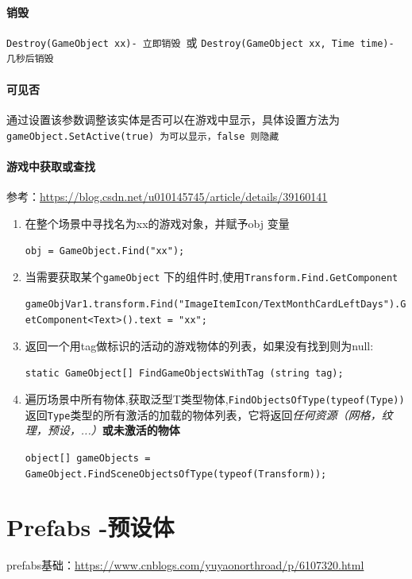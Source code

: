\documentclass[UTF8,a4paper,12pt]{ctexbook}
\begin{document}
		\paragraph{销毁}
			\verb|Destroy(GameObject xx)- 立即销毁 |或 \verb|Destroy(GameObject xx, Time time)- 几秒后销毁|
			
		\paragraph{可见否}
			通过设置该参数调整该实体是否可以在游戏中显示，具体设置方法为\verb|gameObject.SetActive(true) 为可以显示，false 则隐藏|
		
		\paragraph{游戏中获取或查找}
			参考：\url{https://blog.csdn.net/u010145745/article/details/39160141}
			
			\begin{enumerate}
				\item 在整个场景中寻找名为xx的游戏对象，并赋予obj 变量
					
					\verb|obj = GameObject.Find("xx");|
					
				\item 当需要获取某个\verb|gameObject| 下的组件时,使用\verb|Transform.Find.GetComponent|
					
					\verb|gameObjVar1.transform.Find("ImageItemIcon/TextMonthCardLeftDays").GetComponent<Text>().text = "xx";|
				
				\item 返回一个用tag做标识的活动的游戏物体的列表，如果没有找到则为null: 
				
					\verb|static GameObject[] FindGameObjectsWithTag (string tag);|
				
				\item 遍历场景中所有物体,获取泛型T类型物体,\verb|FindObjectsOfType(typeof(Type))|返回\verb|Type|类型的所有激活的加载的物体列表，它将返回\textit{任何资源（网格，纹理，预设，...）}\textbf{或未激活的物体}
				
					\verb|object[] gameObjects = GameObject.FindSceneObjectsOfType(typeof(Transform));|
			\end{enumerate}
	\section{Prefabs -预设体}
		prefabs基础：\url{https://www.cnblogs.com/yuyaonorthroad/p/6107320.html}
		
\end{document}
